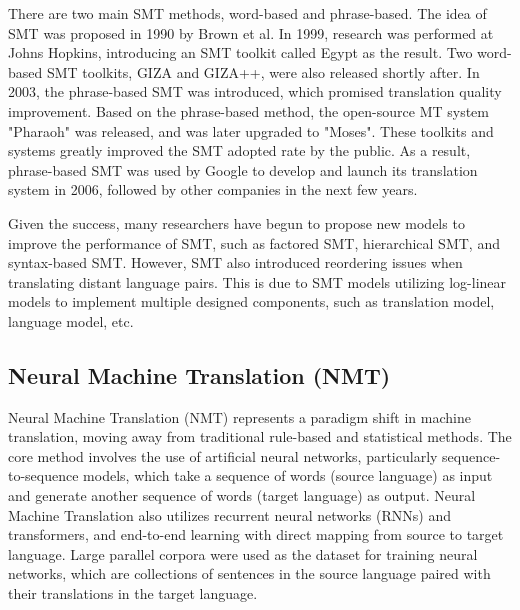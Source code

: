 \documentclass[sigconf]{acmart}
\begin{document}
        There are two main SMT methods, word-based and phrase-based. The idea of SMT was proposed in 1990 by Brown et al. In 1999, research was performed at Johns Hopkins, introducing an SMT toolkit called Egypt as the result. Two word-based SMT toolkits, GIZA and GIZA++, were also released shortly after. In 2003, the phrase-based SMT was introduced, which promised translation quality improvement. Based on the phrase-based method, the open-source MT system "Pharaoh" was released, and was later upgraded to "Moses". These toolkits and systems greatly improved the SMT adopted rate by the public. As a result, phrase-based SMT was used by Google to develop and launch its translation system in 2006, followed by other companies in the next few years\cite{Wang_Wu_He_Huang_Church_2021}.

        Given the success, many researchers have begun to propose new models to improve the performance of SMT, such as factored SMT, hierarchical SMT, and syntax-based SMT. However, SMT also introduced reordering issues when translating distant language pairs. This is due to SMT models utilizing log-linear models to implement multiple designed components, such as translation model, language model, etc\cite{Wang_Wu_He_Huang_Church_2021}.
        
    \subsection{Neural Machine Translation (NMT)}
        Neural Machine Translation (NMT) represents a paradigm shift in machine translation, moving away from traditional rule-based and statistical methods. The core method involves the use of artificial neural networks, particularly sequence-to-sequence models, which take a sequence of words (source language) as input and generate another sequence of words (target language) as output. Neural Machine Translation also utilizes recurrent neural networks (RNNs) and transformers, and end-to-end learning with direct mapping from source to target language\cite{dabre_chu_kunchukuttan_2020}. Large parallel corpora were used as the dataset for training neural networks, which are collections of sentences in the source language paired with their translations in the target language.
        
\end{document}
